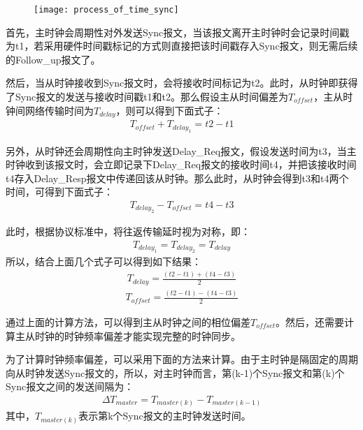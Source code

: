 \begin{figure}[!hbp]
  \centering
  \begin{minipage}[b]{0.6\textwidth}
    \captionstyle{\centering}
    \centering
    \texttt{[image: process\_of\_time\_sync]}
  \end{minipage}     
\end{figure}

首先，主时钟会周期性对外发送Sync报文，当该报文离开主时钟时会记录时间戳为t1，若采用硬件时间戳标记的方式则直接把该时间戳存入Sync报文，则无需后续的Follow\_up报文了。

然后，当从时钟接收到Sync报文时，会将接收时间标记为t2。此时，从时钟即获得了Sync报文的发送与接收时间戳t1和t2。那么假设主从时间偏差为$T_{offset}$，主从时钟间网络传输时间为$T_{delay}$，则可以得到下面式子：
\begin{align}
	T_{offset} + T_{delay_1} = t2 - t1
\end{align}

另外，从时钟还会周期性向主时钟发送Delay\_Req报文，假设发送时间为t3，当主时钟收到该报文时，会立即记录下Delay\_Req报文的接收时间t4，并把该接收时间t4存入Delay\_Resp报文中传递回该从时钟。那么此时，从时钟会得到t3和t4两个时间，可得到下面式子：
\begin{align}
	T_{delay_2} - T_{offset} = t4 - t3
\end{align}

此时，根据协议标准中，将往返传输延时视为对称，即：
\begin{align}
	T_{delay_1} = T_{delay_2} = T_{delay}
\end{align}
所以，结合上面几个式子可以得到如下结果：
\begin{align}
	T_{delay} = \frac{(t2 - t1) + (t4 - t3)}{2}
\end{align}
\begin{align}
	T_{offset} = \frac{(t2 - t1) - (t4 - t3)}{2}
\end{align}

通过上面的计算方法，可以得到主从时钟之间的相位偏差$T_{offset}$。然后，还需要计算主从时钟的时钟频率偏差才能实现完整的时钟同步。

为了计算时钟频率偏差，可以采用下面的方法来计算。由于主时钟是隔固定的周期向从时钟发送Sync报文的，所以，对主时钟而言，第(k-1)个Sync报文和第(k)个Sync报文之间的发送间隔为：
\begin{align}
	\Delta T_{master} = T_{master(k)} - T_{master(k - 1)}
\end{align}
其中，$T_{master(k)}$表示第k个Sync报文的主时钟发送时间。

